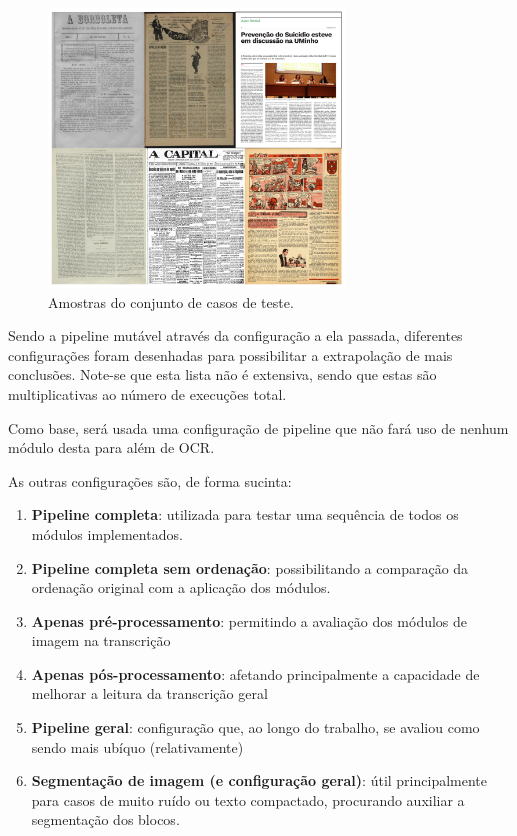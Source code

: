 \begin{figure}[H]
	\centering
	\includegraphics[width=0.7\textwidth]{images/ilustracoes/casos_teste.png}
	\caption{Amostras do conjunto de casos de teste.}
	\label{fig:casos_teste}
\end{figure}


Sendo a pipeline mutável através da configuração a ela passada, diferentes configurações foram desenhadas para possibilitar a extrapolação de mais conclusões. Note-se que esta lista não é extensiva, sendo que estas são multiplicativas ao número de execuções total.

Como base, será usada uma configuração de pipeline que não fará uso de nenhum módulo desta para além de OCR.

As outras configurações são, de forma sucinta:

\begin{enumerate}\setlength\itemsep{-0.9em}
	\item \textbf{Pipeline completa}: utilizada para testar uma sequência de todos os módulos implementados.
	\item \textbf{Pipeline completa sem ordenação}: possibilitando a comparação da ordenação original com a aplicação dos módulos.
	\item \textbf{Apenas pré-processamento}: permitindo a avaliação dos módulos de imagem na transcrição
	\item \textbf{Apenas pós-processamento}: afetando principalmente a capacidade de melhorar a leitura da transcrição geral
	\item \textbf{Pipeline geral}: configuração que, ao longo do trabalho, se avaliou como sendo mais ubíquo (relativamente)
	\item \textbf{Segmentação de imagem (e configuração geral)}: útil principalmente para casos de muito ruído ou texto compactado, procurando auxiliar a segmentação dos blocos.
\end{enumerate}

